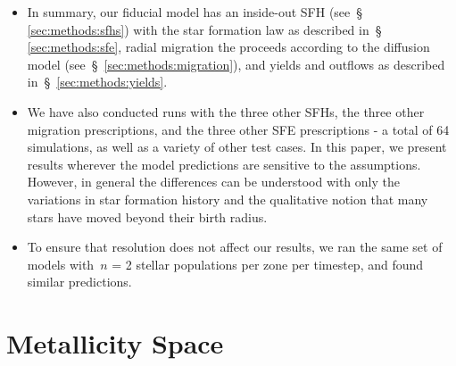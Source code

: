 \documentclass[fleqn, usenatbib]{mnras}
\begin{document}
\begin{itemize} 
	\item In summary, our fiducial model has an inside-out SFH (see~\S 
	\ref{sec:methods:sfhs}) with the star formation law as described in~\S 
	\ref{sec:methods:sfe}, radial migration the proceeds according to the 
	diffusion model (see~\S~\ref{sec:methods:migration}), and yields and 
	outflows as described in~\S~\ref{sec:methods:yields}. 

	\item We have also conducted runs with the three other SFHs, the three 
	other migration prescriptions, and the three other SFE prescriptions - a 
	total of 64 simulations, as well as a variety of other test cases. In this 
	paper, we present results wherever the model predictions are sensitive to 
	the assumptions. However, in general the differences can be understood 
	with only the variations in star formation history and the qualitative 
	notion that many stars have moved beyond their birth radius. 

	\item To ensure that resolution does not affect our results, we ran the 
	same set of models with~$n$ = 2 stellar populations per zone per 
	timestep, and found similar predictions. 
\end{itemize} 

\section{Metallicity Space} 
\label{sec:metallicity_space} 
\end{document}
